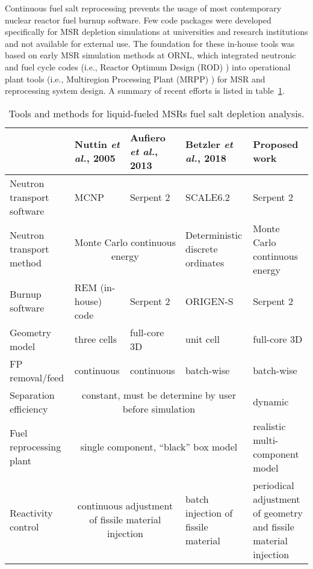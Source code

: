 Continuous fuel salt reprocessing prevents the usage of most contemporary 
nuclear reactor fuel burnup software. Few code packages were developed 
specifically for \gls{MSR} depletion simulations at universities and research 
institutions and not available for external use. The foundation for these 
in-house tools was based on early \gls{MSR} simulation methods at \gls{ORNL}, 
which integrated neutronic and fuel cycle codes (i.e., Reactor Optimum Design 
(ROD) \cite{bauman_rod_1971}) into operational plant tools (i.e., Multiregion 
Processing Plant (MRPP) \cite{kee_mrpp_1976}) for \gls{MSR} and reprocessing 
system design. A summary of recent efforts is listed in 
table~\ref{tab:msr_codes}.
\begin{table}[t]
\fontsize{9}{11}\selectfont
\caption{Tools and methods for liquid-fueled \glspl{MSR} fuel salt depletion analysis.}
\begin{tabularx}{\textwidth}{X X X X X} 
\hline 
&Nuttin \emph{et al.}, 2005 \cite{nuttin_potential_2005}& Aufiero \emph{et al.}, 2013 \cite{aufiero_extended_2013} & Betzler \emph{et al.}, 2018 \cite{betzler_fuel_2018}&Proposed work \\ [12pt]
\hline
Neutron transport software & \gls{MCNP} & Serpent 2 & SCALE6.2 & Serpent 2 \\ [12pt]
Neutron transport method & \multicolumn{2}{c}{Monte Carlo continuous energy} & Deterministic discrete ordinates & Monte Carlo continuous energy \\ [12pt]
Burnup software & REM (in-house) code & Serpent 2 & ORIGEN-S & Serpent 2 \\ [12pt]
Geometry model & three cells & full-core 3D & unit cell & full-core 3D\\ [12pt]
\gls{FP} removal/feed  & continuous &continuous & batch-wise & batch-wise\\ [12pt]
Separation efficiency &\multicolumn{3}{c}{constant, must be determine by user before simulation} & dynamic \\ [12pt]
Fuel reprocessing plant & \multicolumn{3}{c}{single component, ``black'' box model} & realistic multi-component model\\ [12pt]
Reactivity control & \multicolumn{2}{c}{continuous adjustment of fissile material injection} & batch injection of fissile material & periodical adjustment of geometry and fissile material injection\\
\hline
\end{tabularx}
  \label{tab:msr_codes}
\end{table}

